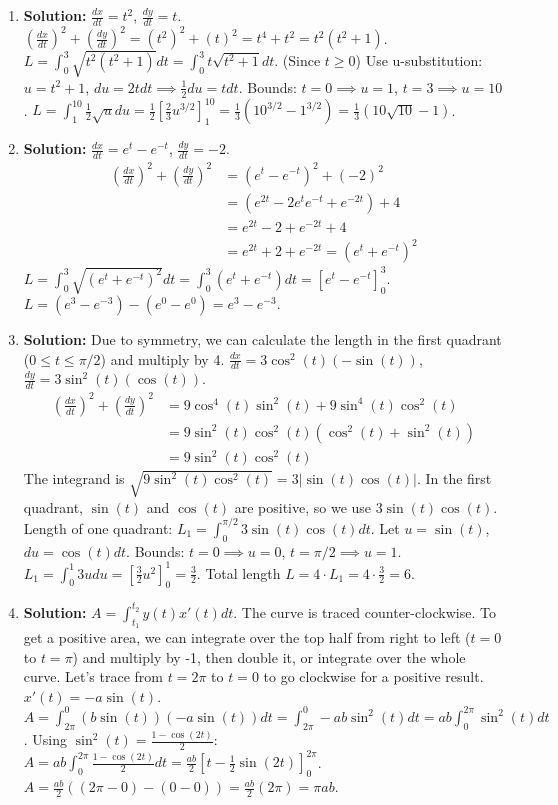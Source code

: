 \documentclass{article}
\begin{document}
\begin{enumerate}
\item \textbf{Solution:}
$\frac{dx}{dt} = t^2$, $\frac{dy}{dt} = t$.
$(\frac{dx}{dt})^2 + (\frac{dy}{dt})^2 = (t^2)^2 + (t)^2 = t^4 + t^2 = t^2(t^2+1)$.
$L = \int_0^3 \sqrt{t^2(t^2+1)} dt = \int_0^3 t\sqrt{t^2+1} dt$. (Since $t \ge 0$)
Use u-substitution: $u=t^2+1$, $du=2t dt \implies \frac{1}{2}du = t dt$.
Bounds: $t=0 \implies u=1$, $t=3 \implies u=10$.
$L = \int_1^{10} \frac{1}{2}\sqrt{u} du = \frac{1}{2} \left[ \frac{2}{3}u^{3/2} \right]_1^{10} = \frac{1}{3}(10^{3/2} - 1^{3/2}) = \frac{1}{3}(10\sqrt{10} - 1)$.

\item \textbf{Solution:}
$\frac{dx}{dt} = e^t - e^{-t}$, $\frac{dy}{dt} = -2$.
\begin{align*}
(\frac{dx}{dt})^2 + (\frac{dy}{dt})^2 &= (e^t - e^{-t})^2 + (-2)^2 \\
&= (e^{2t} - 2e^t e^{-t} + e^{-2t}) + 4 \\
&= e^{2t} - 2 + e^{-2t} + 4 \\
&= e^{2t} + 2 + e^{-2t} = (e^t + e^{-t})^2
\end{align*}
$L = \int_0^3 \sqrt{(e^t + e^{-t})^2} dt = \int_0^3 (e^t + e^{-t}) dt = [e^t - e^{-t}]_0^3$.
$L = (e^3 - e^{-3}) - (e^0 - e^0) = e^3 - e^{-3}$.

\item \textbf{Solution:} Due to symmetry, we can calculate the length in the first quadrant ($0 \le t \le \pi/2$) and multiply by 4.
$\frac{dx}{dt} = 3\cos^2(t)(-\sin(t))$, $\frac{dy}{dt} = 3\sin^2(t)(\cos(t))$.
\begin{align*}
(\frac{dx}{dt})^2 + (\frac{dy}{dt})^2 &= 9\cos^4(t)\sin^2(t) + 9\sin^4(t)\cos^2(t) \\
&= 9\sin^2(t)\cos^2(t)(\cos^2(t) + \sin^2(t)) \\
&= 9\sin^2(t)\cos^2(t)
\end{align*}
The integrand is $\sqrt{9\sin^2(t)\cos^2(t)} = 3|\sin(t)\cos(t)|$.
In the first quadrant, $\sin(t)$ and $\cos(t)$ are positive, so we use $3\sin(t)\cos(t)$.
Length of one quadrant: $L_1 = \int_0^{\pi/2} 3\sin(t)\cos(t) dt$.
Let $u=\sin(t)$, $du=\cos(t)dt$. Bounds: $t=0 \implies u=0$, $t=\pi/2 \implies u=1$.
$L_1 = \int_0^1 3u du = \left[ \frac{3}{2}u^2 \right]_0^1 = \frac{3}{2}$.
Total length $L = 4 \cdot L_1 = 4 \cdot \frac{3}{2} = 6$.

\item \textbf{Solution:}
$A = \int_{t_1}^{t_2} y(t) x'(t) dt$.
The curve is traced counter-clockwise. To get a positive area, we can integrate over the top half from right to left ($t=0$ to $t=\pi$) and multiply by -1, then double it, or integrate over the whole curve. Let's trace from $t=2\pi$ to $t=0$ to go clockwise for a positive result.
$x'(t) = -a\sin(t)$.
$A = \int_{2\pi}^0 (b\sin(t))(-a\sin(t)) dt = \int_{2\pi}^0 -ab\sin^2(t) dt = ab\int_0^{2\pi} \sin^2(t) dt$.
Using $\sin^2(t) = \frac{1-\cos(2t)}{2}$:
$A = ab \int_0^{2\pi} \frac{1-\cos(2t)}{2} dt = \frac{ab}{2} \left[ t - \frac{1}{2}\sin(2t) \right]_0^{2\pi}$.
$A = \frac{ab}{2} ((2\pi - 0) - (0 - 0)) = \frac{ab}{2}(2\pi) = \pi ab$.


\end{enumerate}
\end{document}
